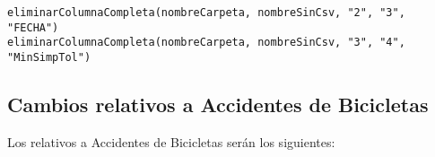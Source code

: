 \begin{itemize}
\begin{lstlisting}[style=Python, caption=Llamadas a eliminarColumnaCompleta]
eliminarColumnaCompleta(nombreCarpeta, nombreSinCsv, "2", "3", "FECHA")
eliminarColumnaCompleta(nombreCarpeta, nombreSinCsv, "3", "4", "MinSimpTol")
\end{lstlisting}


\end{itemize}


\clearpage
\subsection{Cambios relativos a Accidentes de Bicicletas}

Los relativos a Accidentes de Bicicletas serán los siguientes:
    
